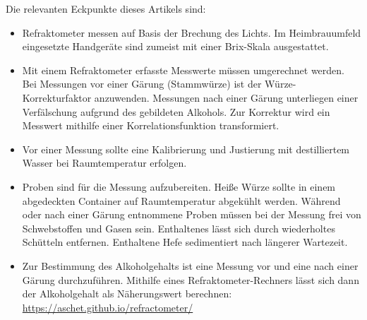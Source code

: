 \documentclass[a4paper,parskip=half]{scrartcl}
\begin{document}
Die relevanten Eckpunkte dieses Artikels sind:

\begin{itemize}
\item Refraktometer messen auf Basis der Brechung des Lichts. Im
Heimbrauumfeld eingesetzte Handgeräte sind zumeist mit einer 
Brix-Skala ausgestattet.
\item Mit einem Refraktometer erfasste Messwerte müssen umgerechnet
werden. Bei Messungen vor einer Gärung (Stammwürze) ist der
Würze-Korrekturfaktor anzuwenden. Messungen nach
einer Gärung unterliegen einer Verfälschung aufgrund des gebildeten
Alkohols. Zur Korrektur wird ein Messwert mithilfe einer
Korrelationsfunktion transformiert.
\item Vor einer Messung sollte eine Kalibrierung und Justierung
mit destilliertem Wasser bei Raumtemperatur erfolgen.
\item Proben sind für die Messung aufzubereiten. Heiße Würze
sollte in einem abgedeckten Container auf Raumtemperatur
abgekühlt werden. Während oder nach einer Gärung entnommene
Proben müssen bei der Messung frei von Schwebstoffen und Gasen sein.
Enthaltenes  lässt sich durch wiederholtes Schütteln
entfernen. Enthaltene Hefe sedimentiert nach längerer Wartezeit.
\item Zur Bestimmung des Alkoholgehalts ist eine Messung
vor und eine nach einer Gärung durchzuführen. Mithilfe eines
Refraktometer-Rechners lässt sich dann der Alkoholgehalt
als Näherungswert berechnen: \url{https://aschet.github.io/refractometer/}

\end{itemize}

\printbibliography[title=Quellen]
\end{document}
